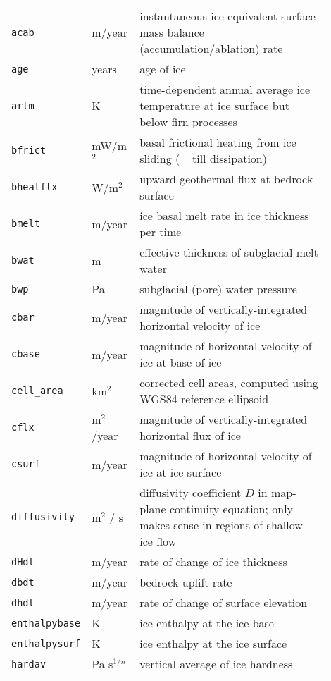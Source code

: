 \begin{center}
  \begin{xtabular}{p{0.15\linewidth}p{0.15\linewidth}p{0.6\linewidth}}
    \label{tab:extra-vars}
    \texttt{acab} &m/year & instantaneous ice-equivalent surface mass balance (accumulation/ablation) rate \\
    \texttt{age} & years & age of ice \\
    \texttt{artm} & K & time-dependent annual average ice temperature at ice surface but below firn processes\\
    \texttt{bfrict} & mW/m$^{2}$ & basal frictional heating from ice sliding (= till dissipation) \\
    \texttt{bheatflx} & W/m$^{2}$ & upward geothermal flux at bedrock surface \\
    \texttt{bmelt} & m/year & ice basal melt rate in ice thickness per time \\
    \texttt{bwat} & m & effective thickness of subglacial melt water \\
    \texttt{bwp} & Pa & subglacial (pore) water pressure \\
    \texttt{cbar} & m/year & magnitude of vertically-integrated horizontal velocity of ice \\
    \texttt{cbase} & m/year & magnitude of horizontal velocity of ice at base of ice \\
    \texttt{cell_area} & km$^{2}$ & corrected cell areas, computed using WGS84
    reference ellipsoid\\
    \texttt{cflx} & m$^{2}$/year & magnitude of vertically-integrated horizontal flux of ice \\
    \texttt{csurf} & m/year & magnitude of horizontal velocity of ice at ice
    surface \\
    \texttt{diffusivity} & m$^{2}$ / s & diffusivity coefficient $D$ in
    map-plane continuity equation; only makes sense in regions of shallow ice
    flow \\
    \texttt{dHdt} & m/year & rate of change of ice thickness \\
    \texttt{dbdt} & m/year& bedrock uplift rate \\
    \texttt{dhdt} & m/year& rate of change of surface elevation \\
    \texttt{enthalpybase} & K & ice enthalpy at the ice base\\
    \texttt{enthalpysurf} & K & ice enthalpy at the ice surface\\
    \texttt{hardav} & Pa s$^{1/n}$ & vertical average of ice hardness \\

\end{xtabular}
\end{center}
